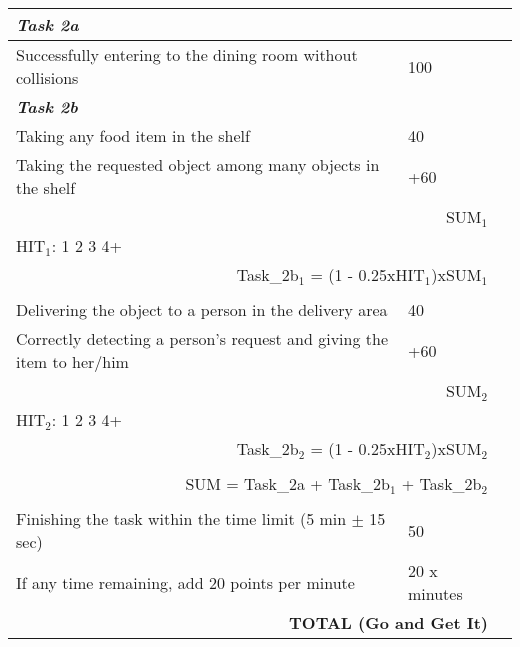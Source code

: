 \documentclass{article}
\begin{document}
\begin{center}
\begin{tabular}{ |m{8cm}|m{3cm}|m{1cm}| } 
    \hline
    \multicolumn{3}{|l|}{\textbf{\textit{Task 2a}}} \\ 
    \hline
    Successfully entering to the dining room without collisions & 100 & \\ 
    \hline
    \multicolumn{3}{|l|}{\textbf{\textit{Task 2b}}} \\ 
    \hline
    Taking any food item in the shelf & 40 & \\ 
    \hline
    Taking the requested object among many objects in the shelf & +60 & \\ 
    \hline
    \multicolumn{2}{|r|}{SUM$_1$  } &\\
    \hline
    \multicolumn{3}{|l|}{HIT$_1$:\hspace*{2cm} 1\hspace*{2cm} 2\hspace*{2cm} 3\hspace*{2cm} 4+} \\ 
    \hline
    \multicolumn{2}{|r|}{Task\_2b$_1$ = (1 - 0.25xHIT$_1$)xSUM$_1$} &\\
    \hline
    \multicolumn{3}{|l|}{}\\
    \hline
    Delivering the object to a person in the delivery area & 40 & \\ 
    \hline
    Correctly detecting a person's request and giving the item to her/him & +60 & \\ 
    \hline
    \multicolumn{2}{|r|}{SUM$_2$  } &\\
    \hline
    \multicolumn{3}{|l|}{HIT$_2$:\hspace*{2cm} 1\hspace*{2cm} 2\hspace*{2cm} 3\hspace*{2cm} 4+} \\ 
    \hline
    \multicolumn{2}{|r|}{Task\_2b$_2$ = (1 - 0.25xHIT$_2$)xSUM$_2$} &\\
    \hline
    \multicolumn{3}{|l|}{}\\
    \hline
    \multicolumn{2}{|r|}{SUM = Task\_2a + Task\_2b$_1$ + Task\_2b$_2$  } &\\
    \hline
    \multicolumn{3}{|l|}{}\\
    \hline
    Finishing the task within the time limit (5 min $\pm$ 15 sec) & 50 & \\ 
    \hline
    If any time remaining, add 20 points per minute & 20 x minutes & \\ 
    \hline
    \multicolumn{2}{|r|}{\textbf{TOTAL (Go and Get It)}  } &\\
    \hline
\end{tabular}
\end{center}
\end{document}
